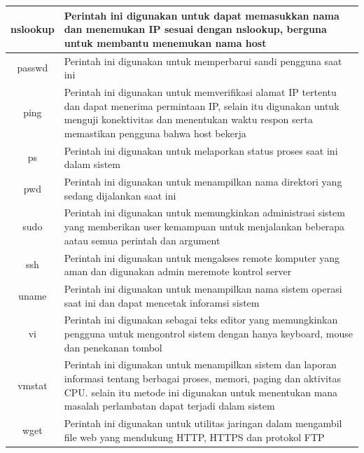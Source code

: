 \begin{table}[h]
\begin{tabular}{|c|l|}
			\hline
			 nslookup&Perintah ini digunakan untuk dapat memasukkan nama dan menemukan IP sesuai dengan nslookup, berguna untuk membantu menemukan nama host\\
			\hline
			passwd&Perintah ini digunakan untuk memperbarui sandi pengguna saat ini\\
			\hline
			ping&Perintah ini digunakan untuk memverifikasi alamat IP tertentu dan dapat menerima permintaan IP, selain itu digunakan untuk menguji konektivitas dan menentukan waktu respon serta memastikan pengguna bahwa host bekerja\\
			\hline
			ps&Perintah ini digunakan untuk melaporkan status proses saat ini dalam sistem\\
			\hline
			pwd&Perintah ini digunakan untuk menampilkan nama direktori yang sedang dijalankan saat ini\\
			\hline
			sudo&Perintah ini digunakan untuk memungkinkan administrasi sistem yang memberikan user kemampuan untuk menjalankan beberapa aatau semua perintah dan argument\\
			\hline
			ssh&Perintah ini digunakan untuk mengakses remote komputer yang aman dan digunakan admin meremote kontrol server\\
			\hline
			uname&Perintah ini digunakan untuk menampilkan nama sistem operasi saat ini dan dapat mencetak inforamsi sistem\\
			\hline
			vi&Perintah ini digunakan sebagai teks editor yang memungkinkan pengguna untuk mengontrol sistem dengan hanya keyboard, mouse dan penekanan tombol \\
			\hline
			vmstat&Perintah ini digunakan untuk menampilkan sistem dan laporan informasi tentang berbagai proses, memori, paging dan aktivitas CPU. selain itu metode ini digunakan untuk menentukan mana masalah perlambatan dapat terjadi dalam sistem\\
			\hline
			wget&Perintah ini digunakan untuk utilitas jaringan dalam mengambil file web yang mendukung HTTP, HTTPS dan protokol FTP\\
			\hline
		\end{tabular}
		\end{table}

